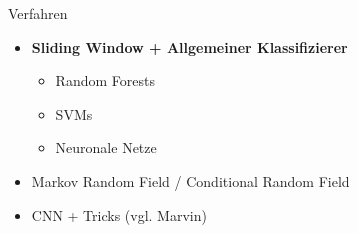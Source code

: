 \begin{frame}{Verfahren}
    \begin{itemize}
        \item \textbf{Sliding Window + Allgemeiner Klassifizierer}
        \begin{itemize}
            \item Random Forests
            \item SVMs
            \item Neuronale Netze
        \end{itemize}
        \item Markov Random Field / Conditional Random Field
        \item CNN + Tricks (vgl. Marvin)
    \end{itemize}
\end{frame}
